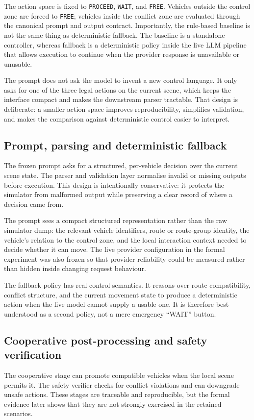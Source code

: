 \documentclass[letterpaper,10pt,conference]{ieeeconf}
\begin{document}
The action space is fixed to \texttt{PROCEED}, \texttt{WAIT}, and \texttt{FREE}. Vehicles outside the control zone are forced to \texttt{FREE}; vehicles inside the conflict zone are evaluated through the canonical prompt and output contract. Importantly, the rule-based baseline is not the same thing as deterministic fallback. The baseline is a standalone controller, whereas fallback is a deterministic policy inside the live LLM pipeline that allows execution to continue when the provider response is unavailable or unusable.

The prompt does not ask the model to invent a new control language. It only asks for one of the three legal actions on the current scene, which keeps the interface compact and makes the downstream parser tractable. That design is deliberate: a smaller action space improves reproducibility, simplifies validation, and makes the comparison against deterministic control easier to interpret.

\subsection{Prompt, parsing and deterministic fallback}
The frozen prompt asks for a structured, per-vehicle decision over the current scene state. The parser and validation layer normalise invalid or missing outputs before execution. This design is intentionally conservative: it protects the simulator from malformed output while preserving a clear record of where a decision came from.

The prompt sees a compact structured representation rather than the raw simulator dump: the relevant vehicle identifiers, route or route-group identity, the vehicle's relation to the control zone, and the local interaction context needed to decide whether it can move. The live provider configuration in the formal experiment was also frozen so that provider reliability could be measured rather than hidden inside changing request behaviour.

The fallback policy has real control semantics. It reasons over route compatibility, conflict structure, and the current movement state to produce a deterministic action when the live model cannot supply a usable one. It is therefore best understood as a second policy, not a mere emergency ``WAIT'' button.

\subsection{Cooperative post-processing and safety verification}
The cooperative stage can promote compatible vehicles when the local scene permits it. The safety verifier checks for conflict violations and can downgrade unsafe actions. These stages are traceable and reproducible, but the formal evidence later shows that they are not strongly exercised in the retained scenarios.
\end{document}
